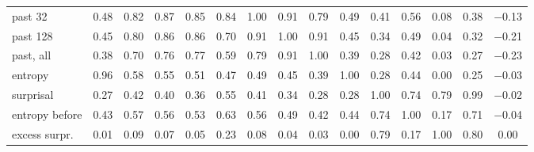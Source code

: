 \begin{table}[H]
\begin{tabular}{lcccccccccccccc}
    past 32 & \cellcolor{red!29}0.48 & \cellcolor{red!49}0.82 & \cellcolor{red!52}0.87 & \cellcolor{red!51}0.85 & \cellcolor{red!50}0.84 & \cellcolor{red!60}1.00 & \cellcolor{red!54}0.91 & \cellcolor{red!47}0.79 & \cellcolor{red!29}0.49 & \cellcolor{red!24}0.41 & \cellcolor{red!33}0.56 & \cellcolor{red!5}0.08 & \cellcolor{red!23}0.38 & \cellcolor{blue!8}$-$0.13 \\
    past 128 & \cellcolor{red!27}0.45 & \cellcolor{red!48}0.80 & \cellcolor{red!52}0.86 & \cellcolor{red!52}0.86 & \cellcolor{red!42}0.70 & \cellcolor{red!54}0.91 & \cellcolor{red!60}1.00 & \cellcolor{red!55}0.91 & \cellcolor{red!27}0.45 & \cellcolor{red!20}0.34 & \cellcolor{red!30}0.49 & \cellcolor{red!2}0.04 & \cellcolor{red!19}0.32 & \cellcolor{blue!13}$-$0.21 \\
    past, all & \cellcolor{red!23}0.38 & \cellcolor{red!42}0.70 & \cellcolor{red!46}0.76 & \cellcolor{red!46}0.77 & \cellcolor{red!35}0.59 & \cellcolor{red!47}0.79 & \cellcolor{red!55}0.91 & \cellcolor{red!60}1.00 & \cellcolor{red!23}0.39 & \cellcolor{red!17}0.28 & \cellcolor{red!25}0.42 & \cellcolor{red!2}0.03 & \cellcolor{red!16}0.27 & \cellcolor{blue!14}$-$0.23 \\
    entropy & \cellcolor{red!58}0.96 & \cellcolor{red!35}0.58 & \cellcolor{red!33}0.55 & \cellcolor{red!31}0.51 & \cellcolor{red!28}0.47 & \cellcolor{red!29}0.49 & \cellcolor{red!27}0.45 & \cellcolor{red!23}0.39 & \cellcolor{red!60}1.00 & \cellcolor{red!17}0.28 & \cellcolor{red!26}0.44 & \cellcolor{red!0}0.00 & \cellcolor{red!15}0.25 & \cellcolor{blue!2}$-$0.03 \\
    surprisal & \cellcolor{red!16}0.27 & \cellcolor{red!25}0.42 & \cellcolor{red!24}0.40 & \cellcolor{red!22}0.36 & \cellcolor{red!33}0.55 & \cellcolor{red!24}0.41 & \cellcolor{red!20}0.34 & \cellcolor{red!17}0.28 & \cellcolor{red!17}0.28 & \cellcolor{red!60}1.00 & \cellcolor{red!45}0.74 & \cellcolor{red!47}0.79 & \cellcolor{red!59}0.99 & \cellcolor{blue!1}$-$0.02 \\
    entropy before & \cellcolor{red!26}0.43 & \cellcolor{red!34}0.57 & \cellcolor{red!34}0.56 & \cellcolor{red!32}0.53 & \cellcolor{red!38}0.63 & \cellcolor{red!33}0.56 & \cellcolor{red!30}0.49 & \cellcolor{red!25}0.42 & \cellcolor{red!26}0.44 & \cellcolor{red!45}0.74 & \cellcolor{red!60}1.00 & \cellcolor{red!10}0.17 & \cellcolor{red!42}0.71 & \cellcolor{blue!2}$-$0.04 \\
    excess surpr. & \cellcolor{red!0}0.01 & \cellcolor{red!5}0.09 & \cellcolor{red!4}0.07 & \cellcolor{red!3}0.05 & \cellcolor{red!14}0.23 & \cellcolor{red!5}0.08 & \cellcolor{red!2}0.04 & \cellcolor{red!2}0.03 & \cellcolor{red!0}0.00 & \cellcolor{red!47}0.79 & \cellcolor{red!10}0.17 & \cellcolor{red!60}1.00 & \cellcolor{red!48}0.80 & \cellcolor{red!0}0.00 \\

\end{tabular}
\end{table}

